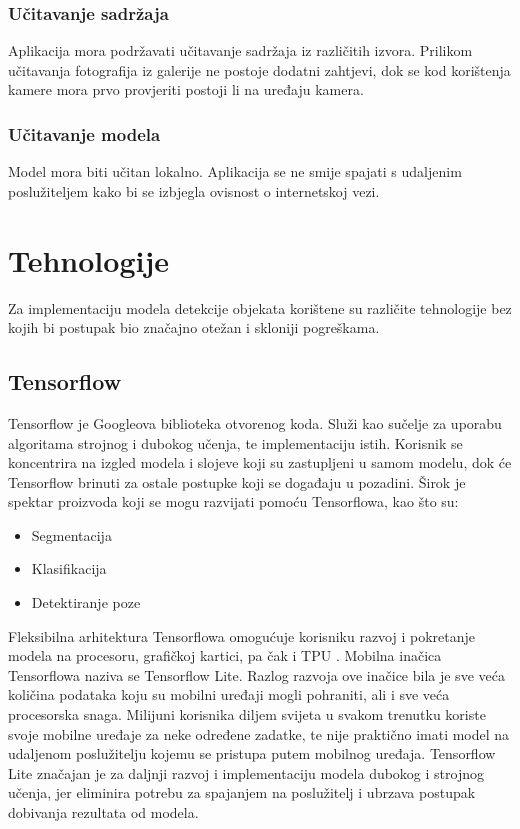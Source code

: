 \subsubsection{Učitavanje sadržaja}
Aplikacija mora podržavati učitavanje sadržaja iz različitih izvora. Prilikom učitavanja fotografija iz galerije 
ne postoje dodatni zahtjevi, dok se kod korištenja kamere mora prvo provjeriti postoji li na uređaju kamera.
\subsubsection{Učitavanje modela}
Model mora biti učitan lokalno. Aplikacija se ne smije spajati s udaljenim poslužiteljem kako bi se izbjegla ovisnost o internetskoj vezi. 

\section{Tehnologije}
Za implementaciju modela detekcije objekata korištene su različite tehnologije bez kojih bi postupak bio značajno otežan i 
skloniji pogreškama.
\subsection{Tensorflow}
Tensorflow je Googleova biblioteka otvorenog koda. Služi kao sučelje za uporabu algoritama strojnog i dubokog učenja, te implementaciju
istih. Korisnik se koncentrira na izgled modela i slojeve koji su zastupljeni u samom
modelu, dok će Tensorflow brinuti za ostale postupke koji se događaju u pozadini. Širok je spektar proizvoda koji se mogu razvijati pomoću
Tensorflowa, kao što su: 
\begin{itemize}
    \item Segmentacija 
    \item Klasifikacija
    \item Detektiranje poze
\end{itemize}
Fleksibilna arhitektura Tensorflowa omogućuje korisniku razvoj i pokretanje modela
na procesoru, grafičkoj kartici, pa čak i TPU .
Mobilna inačica Tensorflowa naziva se Tensorflow Lite. 
Razlog razvoja ove inačice bila je sve veća količina podataka koju su mobilni uređaji 
mogli pohraniti, ali i sve veća procesorska snaga. Milijuni korisnika diljem svijeta u svakom 
trenutku koriste svoje mobilne uređaje za neke određene zadatke, te nije praktično imati model na 
udaljenom poslužitelju kojemu se pristupa putem mobilnog uređaja. Tensorflow Lite značajan je za daljnji razvoj i 
implementaciju modela dubokog i strojnog učenja, jer eliminira potrebu za spajanjem na poslužitelj i ubrzava postupak dobivanja
rezultata od modela.\citep{tensorflow2015-whitepaper}

